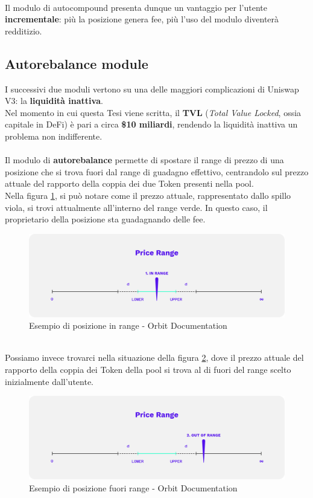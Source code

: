 \documentclass[12pt,a4paper]{report}
\begin{document}
\noindent \\Il modulo di autocompound presenta dunque un vantaggio per l'utente \textbf{incrementale}: più la posizione genera fee, più l'uso del modulo diventerà redditizio.
\subsection{Autorebalance module}

I successivi due moduli vertono su una delle maggiori complicazioni di Uniswap V3: la \textbf{liquidità inattiva}.
\\Nel momento in cui questa Tesi viene scritta, il \textbf{TVL} (\textit{Total Value Locked}, ossia capitale in DeFi) è pari a circa \textbf{\$10 miliardi}, rendendo la liquidità inattiva un problema non indifferente.\\
\\Il modulo di \textbf{autorebalance} permette di spostare il range di prezzo di una posizione che si trova fuori dal range di guadagno effettivo, centrandolo sul prezzo attuale del rapporto della coppia dei due Token presenti nella pool.
\\Nella figura \ref{fig:in_range}, si può notare come il prezzo attuale, rappresentato dallo spillo viola, si trovi attualmente all'interno del range verde. In questo caso, il proprietario della posizione sta guadagnando delle fee.


\begin{figure}[H]
  \includegraphics[scale=0.3]{in_range.png}
  \centering
  \caption{Esempio di posizione in range - Orbit Documentation}
  \label{fig:in_range}
\end{figure}

\noindent \\Possiamo invece trovarci nella situazione della figura \ref{fig:oor}, dove il prezzo attuale del rapporto della coppia dei Token della pool si trova al di fuori del range scelto inizialmente dall'utente.\\

\begin{figure}[H]
  \includegraphics[scale=0.3]{oor.png}
  \centering
  \caption{Esempio di posizione fuori range - Orbit Documentation}
  \label{fig:oor}
\end{figure}
\end{document}
